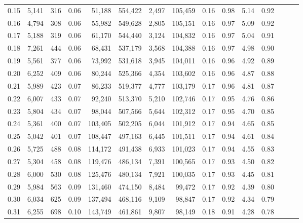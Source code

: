 \begin{tabular}{rrrrrrrrrrrrrrr}
0.15 &   5,141 &    316 &  0.06 &   51,188 &  554,422 &    2,497 &  105,459 &  0.16 &  0.98 &  5.14 &      0.92 \\
0.16 &   4,794 &    308 &  0.06 &   55,982 &  549,628 &    2,805 &  105,151 &  0.16 &  0.97 &  5.09 &      0.92 \\
0.17 &   5,188 &    319 &  0.06 &   61,170 &  544,440 &    3,124 &  104,832 &  0.16 &  0.97 &  5.04 &      0.91 \\
0.18 &   7,261 &    444 &  0.06 &   68,431 &  537,179 &    3,568 &  104,388 &  0.16 &  0.97 &  4.98 &      0.90 \\
0.19 &   5,561 &    377 &  0.06 &   73,992 &  531,618 &    3,945 &  104,011 &  0.16 &  0.96 &  4.92 &      0.89 \\
0.20 &   6,252 &    409 &  0.06 &   80,244 &  525,366 &    4,354 &  103,602 &  0.16 &  0.96 &  4.87 &      0.88 \\
0.21 &   5,989 &    423 &  0.07 &   86,233 &  519,377 &    4,777 &  103,179 &  0.17 &  0.96 &  4.81 &      0.87 \\
0.22 &   6,007 &    433 &  0.07 &   92,240 &  513,370 &    5,210 &  102,746 &  0.17 &  0.95 &  4.76 &      0.86 \\
0.23 &   5,804 &    434 &  0.07 &   98,044 &  507,566 &    5,644 &  102,312 &  0.17 &  0.95 &  4.70 &      0.85 \\
0.24 &   5,361 &    400 &  0.07 &  103,405 &  502,205 &    6,044 &  101,912 &  0.17 &  0.94 &  4.65 &      0.85 \\
0.25 &   5,042 &    401 &  0.07 &  108,447 &  497,163 &    6,445 &  101,511 &  0.17 &  0.94 &  4.61 &      0.84 \\
0.26 &   5,725 &    488 &  0.08 &  114,172 &  491,438 &    6,933 &  101,023 &  0.17 &  0.94 &  4.55 &      0.83 \\
0.27 &   5,304 &    458 &  0.08 &  119,476 &  486,134 &    7,391 &  100,565 &  0.17 &  0.93 &  4.50 &      0.82 \\
0.28 &   6,000 &    530 &  0.08 &  125,476 &  480,134 &    7,921 &  100,035 &  0.17 &  0.93 &  4.45 &      0.81 \\
0.29 &   5,984 &    563 &  0.09 &  131,460 &  474,150 &    8,484 &   99,472 &  0.17 &  0.92 &  4.39 &      0.80 \\
0.30 &   6,034 &    625 &  0.09 &  137,494 &  468,116 &    9,109 &   98,847 &  0.17 &  0.92 &  4.34 &      0.79 \\
0.31 &   6,255 &    698 &  0.10 &  143,749 &  461,861 &    9,807 &   98,149 &  0.18 &  0.91 &  4.28 &      0.78 \\

\end{tabular}
